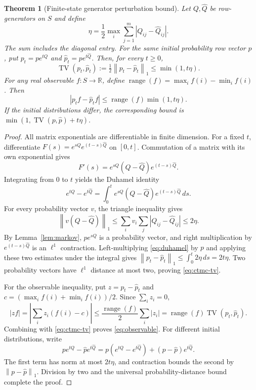 \documentclass[11pt,a4paper]{article}
\theoremstyle{plain}
\newtheorem{theorem}{Theorem}[section]
\theoremstyle{definition}
\theoremstyle{remark}
\DeclareMathOperator{\TV}{TV}
\newcommand{\norm}[1]{\left\lVert #1\right\rVert}
\newcommand{\R}{\mathbb{R}}
\begin{document}
\begin{theorem}[Finite-state generator perturbation bound]
\label{thm:ctmc}
Let $Q,\widehat Q$ be row-generators on $S$ and define
\begin{equation}
 \eta=\frac12\max_i\sum_{j=1}^m|Q_{ij}-\widehat Q_{ij}|.
 \label{eq:eta}
\end{equation}
The sum includes the diagonal entry. For the same initial probability
row vector $p$, put $p_t=pe^{tQ}$ and
$\widehat p_t=pe^{t\widehat Q}$. Then, for every $t\ge0$,
\begin{equation}
 \TV(p_t,\widehat p_t):=\tfrac12\norm{p_t-\widehat p_t}_1
 \le\min(1,t\eta).
 \label{eq:ctmc-tv}
\end{equation}
For any real observable $f:S\to\R$, define
$\operatorname{range}(f)=\max_i f(i)-\min_i f(i)$. Then
\begin{equation}
 |p_t f-\widehat p_t f|
 \le\operatorname{range}(f)\min(1,t\eta).
 \label{eq:observable}
\end{equation}
If the initial distributions differ, the corresponding bound is
$\min(1,\TV(p,\widehat p)+t\eta)$.
\end{theorem}
\begin{proof}
All matrix exponentials are differentiable in finite dimension. For a fixed
$t$, differentiate $F(s)=e^{sQ}e^{(t-s)\widehat Q}$ on $[0,t]$.
Commutation of a matrix with its own exponential gives
\[
 F'(s)=e^{sQ}(Q-\widehat Q)e^{(t-s)\widehat Q}.
\]
Integrating from $0$ to $t$ yields the Duhamel identity
\begin{equation}
 e^{tQ}-e^{t\widehat Q}
 =\int_0^t e^{sQ}(Q-\widehat Q)e^{(t-s)\widehat Q}\,ds.
 \label{eq:duhamel}
\end{equation}
For every probability vector $v$, the triangle inequality gives
\[
 \norm{v(Q-\widehat Q)}_1
 \le\sum_i v_i\sum_j|Q_{ij}-\widehat Q_{ij}|\le2\eta.
\]
By Lemma~\ref{lem:markov}, $pe^{sQ}$ is a probability vector, and
right multiplication by $e^{(t-s)\widehat Q}$ is an $\ell^1$
contraction. Left-multiplying \eqref{eq:duhamel} by $p$ and applying
these two estimates under the integral gives
$\norm{p_t-\widehat p_t}_1\le\int_0^t2\eta\,ds=2t\eta$.
Two probability vectors have $\ell^1$ distance at most two, proving
\eqref{eq:ctmc-tv}.

For the observable inequality, put $z=p_t-\widehat p_t$ and
$c=(\max_i f(i)+\min_i f(i))/2$. Since $\sum_i z_i=0$,
\[
 |zf|=\left|\sum_i z_i(f(i)-c)\right|
 \le\frac{\operatorname{range}(f)}2\sum_i|z_i|
 =\operatorname{range}(f)\TV(p_t,\widehat p_t).
\]
Combining with \eqref{eq:ctmc-tv} proves \eqref{eq:observable}.
For different initial distributions, write
\[
 pe^{tQ}-\widehat p e^{t\widehat Q}
 =p(e^{tQ}-e^{t\widehat Q})
   +(p-\widehat p)e^{t\widehat Q}.
\]
The first term has norm at most $2t\eta$, and contraction bounds the
second by $\norm{p-\widehat p}_1$. Division by two and the universal
probability-distance bound complete the proof.
\end{proof}
\end{document}
